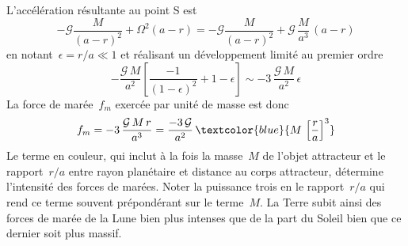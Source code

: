 \sk
L'accélération résultante au point S est
\[ -\mathcal{G} \frac{M}{(a-r)^2} + \Omega^2 (a-r) = -\mathcal{G} \frac{M}{(a-r)^2} + \mathcal{G} \, \frac{M}{a^3} \, (a-r) \]
\noindent en notant~$\epsilon = r/a \ll 1$ et réalisant un développement limité au premier ordre
\[ -\frac{\mathcal{G}\,M}{a^2} \left[ \frac{-1}{(1-\epsilon)^2} + 1-\epsilon \right] \sim - 3 \, \frac{\mathcal{G}\,M}{a^2} \,\epsilon \]
La force de marée~$f_m$ exercée par unité de masse est donc
\[ f_m = - 3 \, \frac{\mathcal{G}\,M\,r}{a^3} = \frac{-3\,\mathcal{G}}{a^2} \, \textcolor{blue}{ M \, \left[ \frac{r}{a} \right]^3 } \]
\noindent Le terme en couleur, qui inclut à la fois la masse~$M$ de l'objet attracteur et le rapport~$r/a$ entre rayon planétaire et distance au corps attracteur, détermine l'intensité des forces de marées. Noter la puissance trois en le rapport~$r/a$ qui rend ce terme souvent prépondérant sur le terme~$M$. La Terre subit ainsi des forces de marée de la Lune bien plus intenses que de la part du Soleil bien que ce dernier soit plus massif.
